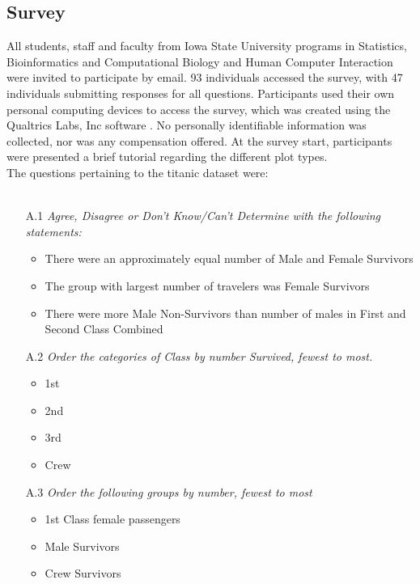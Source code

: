 \subsection*{Survey }\label{app2}
All students, staff and faculty from Iowa State University programs in Statistics, Bioinformatics and Computational Biology and Human Computer Interaction were invited to participate by email. 93 individuals accessed the survey, with 47 individuals submitting responses for all questions. Participants used their own personal computing devices to access the survey, which was created using the  Qualtrics Labs, Inc software \cite{qualtrics}. No personally identifiable information was collected, nor was any compensation offered. At the survey start, participants were presented a brief tutorial regarding the different plot types.  \\

\noindent The questions pertaining to the titanic dataset were: \\ \\
\begin{itemize}
\item[A.1]\emph{Agree, Disagree or Don't Know/Can't Determine with the following statements:}
\begin{itemize}
\item There were an approximately equal number of Male and Female Survivors
\item The group with largest number of travelers was Female Survivors
\item There were more Male Non-Survivors than number of males in First and Second Class Combined
\end{itemize}

\item[A.2]\emph{Order the categories of Class by number Survived, fewest to most.} 
\begin{itemize}
\item 1st
\item 2nd 
\item 3rd
\item Crew
\end{itemize}

\item[A.3]\emph{Order the following groups by number, fewest to most}
\begin{itemize}
\item 1st Class female passengers
\item Male Survivors
\item Crew Survivors
\end{itemize}
\end{itemize}


